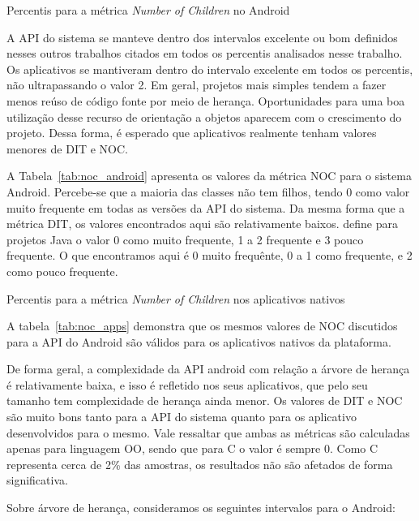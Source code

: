 \begin{table}[!htb]

\caption{Percentis para a métrica \textit{Number of Children} no Android}
\label{tab:noc_android}
\end{table}

A API do sistema se manteve dentro dos intervalos excelente ou bom definidos nesses outros trabalhos citados em todos os percentis analisados nesse trabalho. Os aplicativos se mantiveram dentro do intervalo excelente em todos os percentis, não ultrapassando o valor 2. Em geral, projetos mais simples tendem a fazer menos reúso de código fonte por meio de herança. Oportunidades para uma boa utilização desse recurso de orientação a objetos aparecem com o crescimento do projeto. Dessa forma, é esperado que aplicativos realmente tenham valores menores de DIT e NOC.

A Tabela~\ref{tab:noc_android} apresenta os valores da métrica NOC para o sistema Android. Percebe-se que a maioria das classes não tem filhos, tendo 0 como valor muito frequente em todas as versões da API do sistema. Da mesma forma que a métrica DIT, os valores encontrados aqui são relativamente baixos.  define para projetos Java o valor 0 como muito frequente, 1 a 2 frequente e 3 pouco frequente. O que encontramos aqui é 0 muito frequênte, 0 a 1 como frequente, e 2 como pouco frequente.

\begin{table}[!htb]

\caption{Percentis para a métrica \textit{Number of Children} nos aplicativos nativos}
\label{tab:noc_apps}
\end{table}

A tabela~\ref{tab:noc_apps} demonstra que os mesmos valores de NOC discutidos para a API do Android são válidos para os aplicativos nativos da plataforma. 

De forma geral, a complexidade da API android com relação a árvore de herança é relativamente baixa, e isso é refletido nos seus aplicativos, que pelo seu tamanho tem complexidade de herança ainda menor. Os valores de DIT e NOC são muito bons tanto para a API do sistema quanto para os aplicativo desenvolvidos para o mesmo. Vale ressaltar que ambas as métricas são calculadas apenas para linguagem OO, sendo que para C o valor é sempre 0. Como C representa cerca de 2\% das amostras, os resultados não são afetados de forma significativa.

Sobre árvore de herança, consideramos os seguintes intervalos para o Android:


